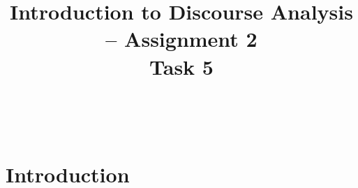 \documentclass[11pt]{article}
\title{\LARGE Introduction to Discourse Analysis -- Assignment 2 \\ Task 5}
\date{}
\author{}
\begin{document}
\maketitle

\,
\vspace{-5em}






\section{Introduction}{

}

\end{document}
